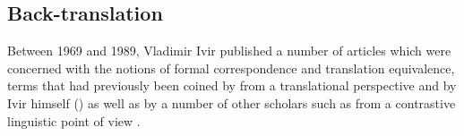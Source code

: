 \subsection{Back-translation}\largerpage[2]
\label{sec:2.3.2}  
Between 1969 and 1989, Vladimir Ivir published a number of articles \citep{ivir_contrasting_1969, ivir_remarks_1970, ivir_formal_1981, ivir_translation-based_1983, dirven_functionalism_1987, radovanovi_translation_1989} which were concerned with the notions of formal correspondence and translation equivalence, terms that had previously been coined by \citet{catford_linguistic_1965} from a translational perspective and by Ivir himself (\citeyear{ivir_contrasting_1969, ivir_remarks_1970}) as well as by a number of other scholars such as \citet{nickel_equivalence_1971, nickel_kontrastive_1972} from a contrastive linguistic point of view \citep[51]{ivir_formal_1981}.

